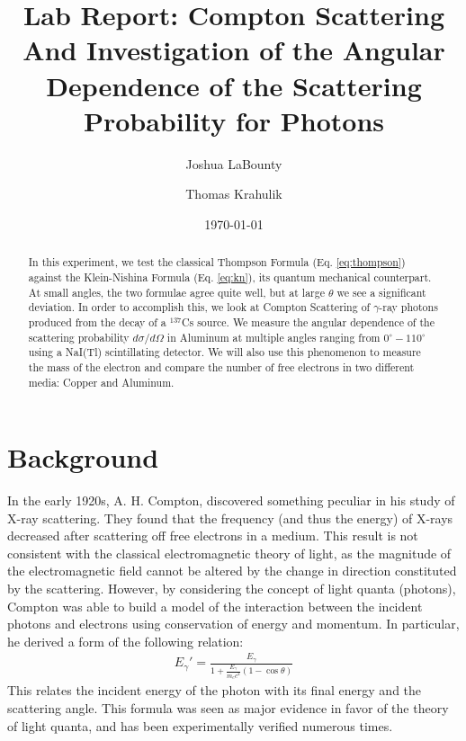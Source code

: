 \documentclass[%
 reprint,
 amsmath,amssymb,
 aps,
 pra,
]{revtex4-1}
\begin{document}

\title{\textbf{Lab Report: Compton Scattering} \\ \small{And Investigation of the Angular Dependence of the Scattering Probability for Photons}}
\author{Joshua LaBounty}
\author{Thomas Krahulik}

\date{\today}

\begin{abstract}
	In this experiment, we test the classical Thompson Formula (Eq. \ref{eq:thompson}) against the Klein-Nishina Formula (Eq. \ref{eq:kn}), its quantum mechanical counterpart. At small angles, the two formulae agree quite well, but at large $\theta$ we see a significant deviation. In order to accomplish this, we look at Compton Scattering of $\gamma$-ray photons produced from the decay of a $^{137}$Cs source. We measure the angular dependence of the scattering probability $d\sigma / d\Omega$ in Aluminum at multiple angles ranging from $0^\circ - 110^\circ$ using a NaI(Tl) scintillating detector. We will also use this phenomenon to measure the mass of the electron and compare the number of free electrons in two different media: Copper and Aluminum.
\end{abstract}
\maketitle

\section{Background}

In the early 1920s, A. H. Compton, discovered something peculiar in his study of X-ray scattering. They found that the frequency (and thus the energy) of X-rays decreased after scattering off free electrons in a medium. This result is not consistent with the classical electromagnetic theory of light, as the magnitude of the electromagnetic field cannot be altered by the change in direction constituted by the scattering. However, by considering the concept of light quanta (photons), Compton was able to build a model of the interaction between the incident photons and electrons using conservation of energy and momentum. In particular, he derived a form of the following relation:
\begin{gather}\label{eq:energy_scatter}
	E_\gamma ' = \frac{E_\gamma}{1 + \frac{E_\gamma}{m_e c^2} (1 - \cos{\theta})}
\end{gather}
This relates the incident energy of the photon with its final energy and the scattering angle. This formula was seen as major evidence in favor of the theory of light quanta, and has been experimentally verified numerous times.
\end{document}
